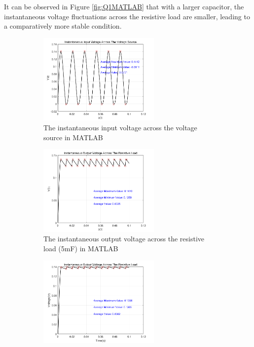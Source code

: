 \documentclass[12pt]{report} %
\begin{document}
It can be observed in Figure \ref{fig:Q1MATLAB} that with a larger capacitor, the instantaneous voltage fluctuations across 
the resistive load are smaller, leading to a comparatively more stable condition.
\begin{figure}[H]
    \centering %
    \begin{subfigure}[b]{\textwidth}
        \centering
        \includegraphics[width=0.65\textwidth]{Image/Q1/Q1A2Vsource.png}
        \caption{The instantaneous input voltage across the voltage source in MATLAB}
        \label{fig:Q1MATLABsub1}
    \end{subfigure}
    \hfill
    \centering %
    \begin{subfigure}[b]{\textwidth}
        \centering
        \includegraphics[width=0.65\textwidth]{Image/Q1/Q1A2Vload.png}
        \caption{The instantaneous output voltage across the resistive load (5mF) in MATLAB}
        \label{fig:Q1MATLABsub2}
    \end{subfigure} 
    \hfill
    \centering %
    \begin{subfigure}[b]{\textwidth}
        \centering
        \includegraphics[width=0.65\textwidth]{Image/Q1/Q1A3Vload.png}

\end{subfigure}
\end{figure}
\end{document}
